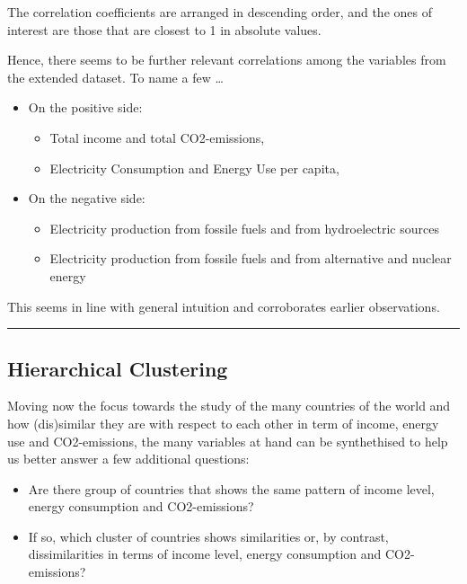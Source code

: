 \documentclass[]{article}
\begin{document}
The correlation coefficients are arranged in descending order, and the
ones of interest are those that are closest to 1 in absolute values.

Hence, there seems to be further relevant correlations among the
variables from the extended dataset. To name a few \ldots{}

\begin{itemize}
\item
  On the positive side:

  \begin{itemize}
  \item
    Total income and total CO2-emissions,
  \item
    Electricity Consumption and Energy Use per capita,
  \end{itemize}
\item
  On the negative side:

  \begin{itemize}
  \item
    Electricity production from fossile fuels and from hydroelectric
    sources
  \item
    Electricity production from fossile fuels and from alternative and
    nuclear energy
  \end{itemize}
\end{itemize}

This seems in line with general intuition and corroborates earlier
observations.

\begin{center}\rule{0.5\linewidth}{\linethickness}\end{center}

\subsection{Hierarchical Clustering}\label{hierarchical-clustering}

Moving now the focus towards the study of the many countries of the
world and how (dis)similar they are with respect to each other in term
of income, energy use and CO2-emissions, the many variables at hand can
be synthethised to help us better answer a few additional questions:

\begin{itemize}
\item
  Are there group of countries that shows the same pattern of income
  level, energy consumption and CO2-emissions?
\item
  If so, which cluster of countries shows similarities or, by contrast,
  dissimilarities in terms of income level, energy consumption and
  CO2-emissions?
\end{itemize}
\end{document}
